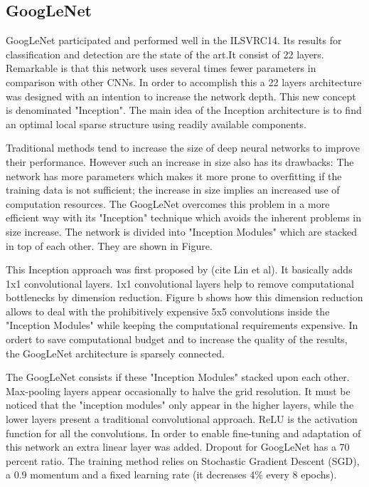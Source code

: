 \subsection{GoogLeNet}
GoogLeNet participated and performed well in the ILSVRC14. Its results for classification and detection are the state of the art.It consist of 22 layers.
Remarkable is that this network uses several times fewer parameters in comparison with other CNNs. In order to accomplish this a 22 layers architecture was designed with an intention to increase the network depth. This new concept is denominated "Inception". The main idea of the Inception architecture is to find an optimal local sparse structure using readily available components.

Traditional methods tend to increase the size of deep neural networks to improve their performance. However such an increase in size also has its drawbacks: The network has more parameters which makes it more prone to overfitting if the training data is not sufficient; the increase in size implies an increased use of computation resources. The GoogLeNet overcomes this problem in a more efficient way with its "Inception" technique which avoids the inherent problems in size increase.
The network is divided into "Inception Modules" which are stacked in top of each other. They are shown in Figure.

This Inception approach was first proposed by (cite Lin et al). It basically adds 1x1 convolutional layers. 1x1 convolutional layers help to remove computational bottlenecks  by dimension reduction. Figure b  shows how this dimension reduction allows to deal with the prohibitively expensive 5x5 convolutions inside the "Inception Modules" while keeping the computational requirements expensive.
In ordert to save computational budget and to increase the quality of the results, the GoogLeNet architecture is sparsely connected.

The GoogLeNet consists if these "Inception Modules" stacked upon each other. Max-pooling layers appear occasionally to halve the grid resolution.  It must be noticed that the "inception modules" only appear in the higher layers, while the lower layers present a traditional convolutional approach. ReLU is the activation function for all the convolutions. In order to enable fine-tuning and adaptation of this network an extra linear layer was added. Dropout for GoogLeNet has a 70 percent ratio. The training method relies on Stochastic Gradient Descent (SGD), a 0.9 momentum  and a fixed learning rate (it decreases 4\% every 8 epochs). 

